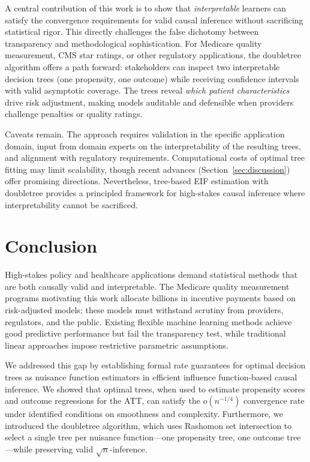 \documentclass[12pt]{article}
\begin{document}
A central contribution of this work is to show that \emph{interpretable} learners can satisfy the convergence requirements for valid causal inference without sacrificing statistical rigor. This directly challenges the false dichotomy between transparency and methodological sophistication. For Medicare quality measurement, CMS star ratings, or other regulatory applications, the doubletree algorithm offers a path forward: stakeholders can inspect two interpretable decision trees (one propensity, one outcome) while receiving confidence intervals with valid asymptotic coverage. The trees reveal \emph{which patient characteristics} drive risk adjustment, making models auditable and defensible when providers challenge penalties or quality ratings.

Caveats remain. The approach requires validation in the specific application domain, input from domain experts on the interpretability of the resulting trees, and alignment with regulatory requirements. Computational costs of optimal tree fitting may limit scalability, though recent advances (Section~\ref{sec:discussion}) offer promising directions. Nevertheless, tree-based EIF estimation with doubletree provides a principled framework for high-stakes causal inference where interpretability cannot be sacrificed.

\section{Conclusion}
\label{sec:conclusion}

High-stakes policy and healthcare applications demand statistical methods that are both causally valid and interpretable. The Medicare quality measurement programs motivating this work allocate billions in incentive payments based on risk-adjusted models; these models must withstand scrutiny from providers, regulators, and the public. Existing flexible machine learning methods achieve good predictive performance but fail the transparency test, while traditional linear approaches impose restrictive parametric assumptions.

We addressed this gap by establishing formal rate guarantees for optimal decision trees as nuisance function estimators in efficient influence function-based causal inference. We showed that optimal trees, when used to estimate propensity scores and outcome regressions for the ATT, can satisfy the $o(n^{-1/4})$ convergence rate under identified conditions on smoothness and complexity. Furthermore, we introduced the doubletree algorithm, which uses Rashomon set intersection to select a single tree per nuisance function---one propensity tree, one outcome tree---while preserving valid $\sqrt{n}$-inference.
\end{document}
